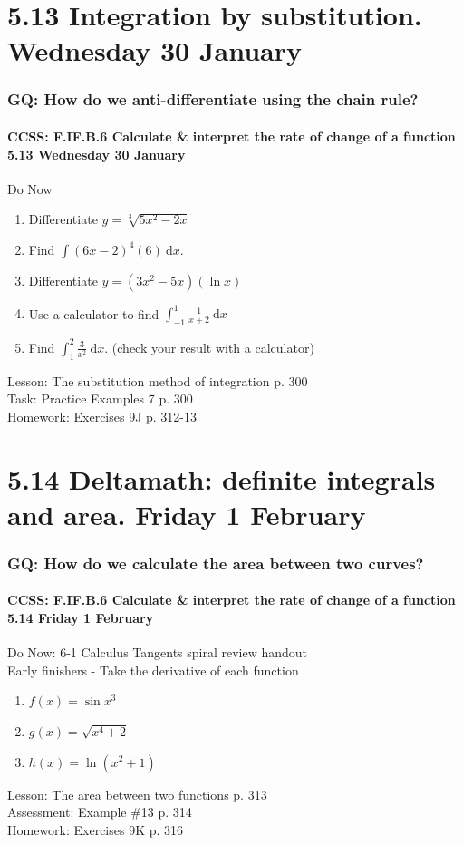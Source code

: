\documentclass{beamer}
\begin{document}
  \section{5.13 Integration by substitution. Wednesday 30 January}
  \frame
  {
    \frametitle{GQ: How do we anti-differentiate using the chain rule?}
    \framesubtitle{CCSS: F.IF.B.6 Calculate \& interpret the rate of change of a function  \alert{5.13 Wednesday 30 January}}

    \begin{block}{Do Now}
    \begin{enumerate}
        \item Differentiate $y=\sqrt[3]{5x^2-2x}$
        \item Find $\int{(6x-2)^4(6)} \ \mathrm{d}x$.
        \item Differentiate $y={(3x^2-5x)(\ln x)}$
        \item Use a calculator to find $\displaystyle \int_{-1}^{1}{\frac{1}{x+2}}\ \mathrm{d}x$
        \item Find $\displaystyle \int_1^2 \frac{3}{x^2}\ \mathrm{d}x$. (check your result with a calculator)
    \end{enumerate}
    \end{block}
    Lesson: The substitution method of integration p. 300\\%
    Task: Practice Examples 7 p. 300\\%
    Homework: Exercises 9J p. 312-13
  }

  \section{5.14 Deltamath: definite integrals and area. Friday 1 February}
  \frame
  {
    \frametitle{GQ: How do we calculate the area between two curves?}
    \framesubtitle{CCSS: F.IF.B.6 Calculate \& interpret the rate of change of a function  \alert{5.14 Friday 1 February}}

    \begin{block}{Do Now: 6-1 Calculus Tangents spiral review handout \\ Early finishers - Take the derivative of each function}
      \begin{enumerate}
      \item $f(x)=\sin{x^3}$
      \item $g(x)=\sqrt{x^4+2}$
      \item $h(x)=\ln{(x^2+1)}$
      \end{enumerate}
   \end{block}
    Lesson: The area between two functions p. 313\\%
    Assessment: Example \#13 p. 314 \\%
    Homework: Exercises 9K p. 316
  }
\end{document}
